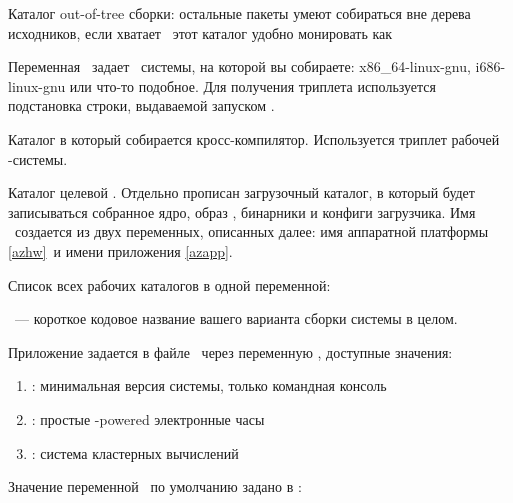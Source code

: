 
Каталог out-of-tree сборки: остальные пакеты умеют собираться вне дерева
исходников, если хватает \ram\ этот каталог удобно монировать как 


Переменная \ задает \ системы, на которой вы
собираете: x86\_64-linux-gnu, i686-linux-gnu или что-то подобное. Для получения
триплета используется подстановка строки, выдаваемой запуском .


Каталог в который собирается кросс-компилятор. Используется триплет
рабочей \linux-системы.


Каталог целевой . Отдельно прописан загрузочный каталог, в который
будет записываться собранное ядро, образ , бинарники и конфиги
загрузчика. Имя \ создается из двух переменных, описанных далее: имя
аппаратной платформы \ref{azhw}\ и имени приложения
\ref{azapp}.


Список всех рабочих каталогов в одной переменной:


 \label{azgz}


\label{azapp}

\ --- короткое кодовое название вашего варианта сборки системы
в целом.

Приложение задается в файле \ через переменную ,
доступные значения:

\begin{enumerate}
  \item {}: минимальная версия системы, только командная консоль
  \item {}: простые \linux-powered электронные часы
  \item {}: система кластерных вычислений
\end{enumerate}

Значение переменной \ по умолчанию задано в :

